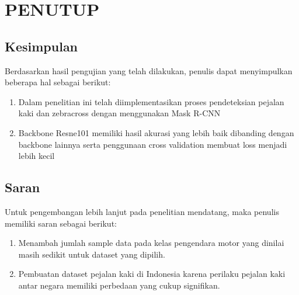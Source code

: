 \chapter{PENUTUP}
\label{chap:penutup}


\section{Kesimpulan}
\label{sec:kesimpulan}

Berdasarkan hasil pengujian yang telah dilakukan, penulis dapat menyimpulkan beberapa hal sebagai berikut:

\begin{enumerate}[nolistsep]

  \item Dalam penelitian ini telah diimplementasikan proses pendeteksian pejalan kaki dan zebracross dengan menggunakan Mask R-CNN
  \item Backbone Resne101 memiliki hasil akurasi yang lebih baik dibanding dengan backbone lainnya serta penggunaan cross validation membuat loss menjadi lebih kecil
  
\end{enumerate}

\section{Saran}
\label{chap:saran}

Untuk pengembangan lebih lanjut pada penelitian mendatang, maka penulis memiliki saran sebagai berikut:

\begin{enumerate}[nolistsep]

  \item Menambah jumlah sample data pada kelas pengendara motor yang dinilai masih sedikit untuk dataset yang dipilih.

  \item Pembuatan dataset pejalan kaki di Indonesia karena perilaku pejalan kaki antar negara memiliki perbedaan yang cukup signifikan.

\end{enumerate}
